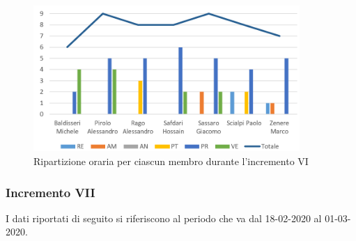 \begin{figure}[!htb]   
    \centering
    \includegraphics[width=0.9\textwidth]{Images/inc6}
	\caption{Ripartizione oraria per ciascun membro durante l'incremento VI}
\end{figure}

\subsubsection{Incremento VII}

I dati riportati di seguito si riferiscono al periodo che va dal 18-02-2020 al 01-03-2020.

